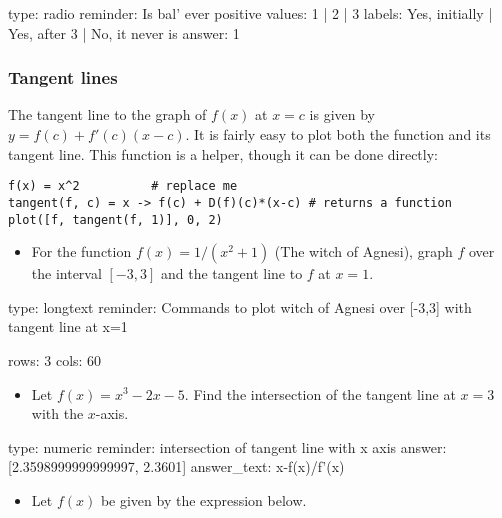\documentclass[12pt]{article}
\begin{document}
\begin{answer}
type: radio
reminder: Is bal' ever positive
values: 1 | 2 | 3
labels: Yes, initially | Yes, after 3 | No, it never is
answer: 1
\end{answer}

\subsubsection{Tangent lines}

The tangent line to the graph of $f(x)$ at $x=c$ is given by
$y = f(c) + f'(c)(x-c)$. It is fairly easy to plot both the function and
its tangent line. This function is a helper, though it can be done
directly:



\begin{verbatim}
f(x) = x^2          # replace me
tangent(f, c) = x -> f(c) + D(f)(c)*(x-c) # returns a function
plot([f, tangent(f, 1)], 0, 2)
\end{verbatim}
\begin{itemize}
\itemsep1pt\parskip0pt
\item
  For the function $f(x) = 1/(x^2 + 1)$ (The witch of Agnesi), graph $f$
  over the interval $[-3,3]$ and the tangent line to $f$ at $x=1$.
\end{itemize}

\begin{answer}
type: longtext
reminder: Commands to plot witch of Agnesi over [-3,3] with tangent line at x=1

rows: 3
cols: 60
\end{answer}

\begin{itemize}
\itemsep1pt\parskip0pt
\item
  Let $f(x) = x^3 -2x - 5$. Find the intersection of the tangent line at
  $x=3$ with the $x$-axis.
\end{itemize}

\begin{answer}
    type: numeric
    reminder: intersection of tangent line with x axis
    answer: [2.3598999999999997, 2.3601]
answer_text: x-f(x)/f'(x) 
\end{answer}

\begin{itemize}
\itemsep1pt\parskip0pt
\item
  Let $f(x)$ be given by the expression below.
\end{itemize}
\end{document}
